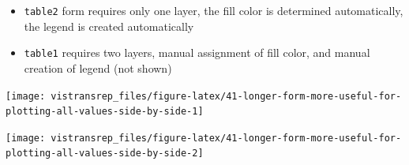 \documentclass[]{book}
\newenvironment{Shaded}{}{}
\newcommand{\DataTypeTok}[1]{#1}
\newcommand{\KeywordTok}[1]{\textcolor[rgb]{0.00,0.00,1.00}{#1}}
\newcommand{\NormalTok}[1]{#1}
\newcommand{\OperatorTok}[1]{#1}
\newcommand{\StringTok}[1]{\textcolor[rgb]{0.00,0.50,0.50}{#1}}
\providecommand{\tightlist}{%
  \setlength{\itemsep}{0pt}\setlength{\parskip}{0pt}}
\begin{document}
\begin{itemize}
\tightlist
\item
  \texttt{table2} form requires only one layer, the fill color is determined automatically, the legend is created automatically
\item
  \texttt{table1} requires two layers, manual assignment of fill color, and manual creation of legend (not shown)
\end{itemize}

\begin{Shaded}
\end{Shaded}

\begin{flushright}\texttt{[image: vistransrep\_files/figure-latex/41-longer-form-more-useful-for-plotting-all-values-side-by-side-1]} \end{flushright}

\begin{Shaded}
\end{Shaded}

\begin{flushright}\texttt{[image: vistransrep\_files/figure-latex/41-longer-form-more-useful-for-plotting-all-values-side-by-side-2]} \end{flushright}
\end{document}
